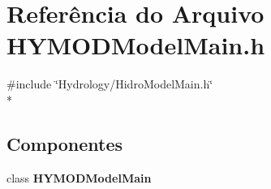 \section{Referência do Arquivo H\+Y\+M\+O\+D\+Model\+Main.\+h}
\label{_h_y_m_o_d_model_main_8h}
{\ttfamily \#include \char`\"{}Hydrology/\+Hidro\+Model\+Main.\+h\char`\"{}}\\*
\subsection*{Componentes}
\begin{DoxyCompactItemize}
\item 
class {\bf H\+Y\+M\+O\+D\+Model\+Main}
\end{DoxyCompactItemize}
